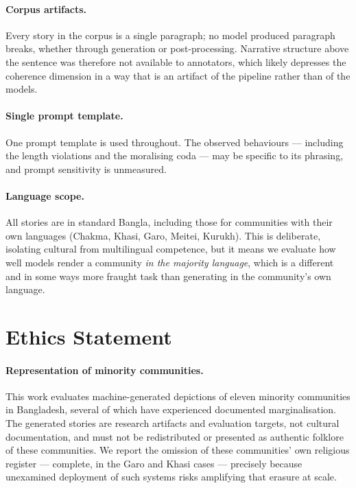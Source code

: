 \documentclass[11pt]{article}
\begin{document}
\paragraph{Corpus artifacts.} Every story in the corpus is a single paragraph;
no model produced paragraph breaks, whether through generation or
post-processing. Narrative structure above the sentence was therefore not
available to annotators, which likely depresses the coherence dimension in a
way that is an artifact of the pipeline rather than of the models.

\paragraph{Single prompt template.} One prompt template is used throughout.
The observed behaviours --- including the length violations and the moralising
coda --- may be specific to its phrasing, and prompt sensitivity is unmeasured.

\paragraph{Language scope.} All stories are in standard Bangla, including those
for communities with their own languages (Chakma, Khasi, Garo, Meitei, Kurukh).
This is deliberate, isolating cultural from multilingual competence, but it
means we evaluate how well models render a community \emph{in the majority
language}, which is a different and in some ways more fraught task than
generating in the community's own language.

\section*{Ethics Statement}

\paragraph{Representation of minority communities.} This work evaluates
machine-generated depictions of eleven minority communities in Bangladesh,
several of which have experienced documented marginalisation. The generated
stories are research artifacts and evaluation targets, not cultural
documentation, and must not be redistributed or presented as authentic
folklore of these communities. We report the omission of these communities' own religious register ---
complete, in the Garo and Khasi cases --- precisely because unexamined
deployment of such systems risks amplifying that erasure at scale.
\end{document}
